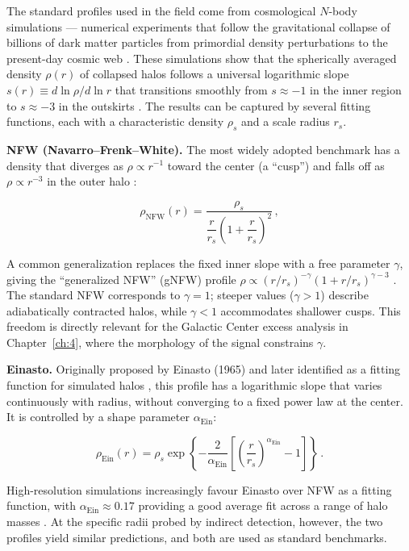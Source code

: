 The standard profiles used in the field come from cosmological $N$-body simulations --- numerical experiments that follow the gravitational collapse of billions of dark matter particles from primordial density perturbations to the present-day cosmic web \cite{Cirelli:2024ssz}.
These simulations show that the spherically averaged density $\rho(r)$ of collapsed halos follows a universal logarithmic slope $s(r) \equiv d\ln\rho / d\ln r$ that transitions smoothly from $s \approx -1$ in the inner region to $s \approx -3$ in the outskirts \cite{Cirelli:2024ssz}.
The results can be captured by several fitting functions, each with a characteristic density $\rho_s$ and a scale radius $r_s$.

\textbf{NFW (Navarro--Frenk--White).}
The most widely adopted benchmark has a density that diverges as $\rho \propto r^{-1}$ toward the center (a ``cusp'') and falls off as $\rho \propto r^{-3}$ in the outer halo \cite{Navarro:1996gj}:

\[ \rho_\text{NFW}(r) = \frac{\rho_s}{\dfrac{r}{r_s}\left(1 + \dfrac{r}{r_s}\right)^2} \,, \]

A common generalization replaces the fixed inner slope with a free parameter $\gamma$, giving the ``generalized NFW'' (gNFW) profile $\rho \propto (r/r_s)^{-\gamma}(1 + r/r_s)^{\gamma - 3}$ \cite{Cirelli:2024ssz}.
The standard NFW corresponds to $\gamma = 1$; steeper values ($\gamma > 1$) describe adiabatically contracted halos, while $\gamma < 1$ accommodates shallower cusps.
This freedom is directly relevant for the Galactic Center excess analysis in Chapter~\ref{ch:4}, where the morphology of the signal constrains $\gamma$.

\textbf{Einasto.}
Originally proposed by Einasto (1965) and later identified as a fitting function for simulated halos \cite{Cirelli:2024ssz}, this profile has a logarithmic slope that varies continuously with radius, without converging to a fixed power law at the center.
It is controlled by a shape parameter $\alpha_\text{Ein}$:

\[ \rho_\text{Ein}(r) = \rho_s \exp\left\{ -\frac{2}{\alpha_\text{Ein}} \left[\left(\frac{r}{r_s}\right)^{\alpha_\text{Ein}} - 1\right]\right\} \,.
\]

High-resolution simulations increasingly favour Einasto over NFW as a fitting function, with $\alpha_\text{Ein} \approx 0.17$ providing a good average fit across a range of halo masses \cite{Cirelli:2024ssz}.
At the specific radii probed by indirect detection, however, the two profiles yield similar predictions, and both are used as standard benchmarks.

